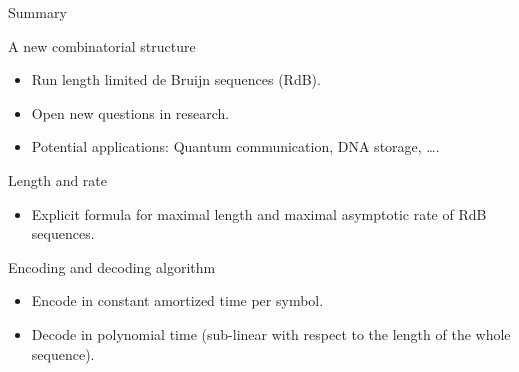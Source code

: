 \begin{frame}{Summary}
    \begin{block}{A new combinatorial structure}
        \begin{itemize}
            \item Run length limited de Bruijn sequences (RdB).
            \item Open new questions in research.
            \item Potential applications: Quantum communication, DNA storage, \dots.
        \end{itemize}
    \end{block}
    
    \begin{block}{Length and rate}
        \begin{itemize}
            \item Explicit formula for maximal length and maximal asymptotic rate of RdB sequences.
        \end{itemize}
    \end{block}
    
    \begin{block}{Encoding and decoding algorithm}
        \begin{itemize}
            \item Encode in constant amortized time per symbol.
            \item Decode in polynomial time (sub-linear with respect to the length of the whole sequence).
        \end{itemize}
    \end{block}
\end{frame}

